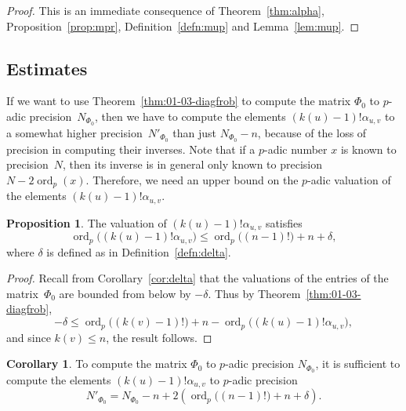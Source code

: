 \documentclass[a4paper,11pt]{article}
\numberwithin{equation}{section}
\DeclareMathOperator{\ord}{ord}          %
\theoremstyle{definition}
\newtheorem{prop}[thm]{Proposition}
\newtheorem{cor}[thm]{Corollary}
\begin{document}
\begin{proof}
This is an immediate consequence of Theorem~\ref{thm:alpha}, 
Proposition~\ref{prop:mpr}, Definition~\ref{defn:mup} and 
Lemma~\ref{lem:mup}.
\end{proof}

\subsection{Estimates}

If we want to use Theorem~\ref{thm:01-03-diagfrob} to compute the matrix 
$\Phi_0$ to $p$-adic precision~$N_{\Phi_0}$, then we have to compute the elements
$(k(u)-1)!\alpha_{u,v}$ to a somewhat higher precision~$N'_{\Phi_0}$ than just
$N_{\Phi_0}-n$, because of the loss of precision in computing their inverses. Note 
that if a $p$-adic number $x$ is known to precision~$N$, then its inverse 
is in general only known to precision $N-2\ord_p(x)$. Therefore, we need an 
upper bound on the $p$-adic valuation of the elements $(k(u)-1)!\alpha_{u,v}$.

\begin{prop}
The valuation of $(k(u)-1)! \alpha_{u,v}$ satisfies
\begin{equation*}
\ord_p\bigl((k(u)-1)! \alpha_{u,v}\bigr) 
    \leq \ord_p\bigl((n-1)!\bigr) + n + \delta,
\end{equation*}
where $\delta$ is defined as in Definition~\ref{defn:delta}. 
\end{prop}

\begin{proof}
Recall from Corollary~\ref{cor:delta} that the valuations 
of the entries of the matrix~$\Phi_0$ are bounded from below by $-\delta$. 
Thus by Theorem~\ref{thm:01-03-diagfrob}, 
\begin{equation*}
-\delta \leq \ord_p\bigl((k(v)-1)!\bigr) + n 
           - \ord_p\bigl((k(u)-1)! \alpha_{u,v}\bigr),
\end{equation*}
and since $k(v) \leq n$, the result follows.
\end{proof}

\begin{cor} \label{cor:Ntilde}
To compute the matrix $\Phi_0$ to $p$-adic precision $N_{\Phi_0}$, it is sufficient 
to compute the elements $(k(u)-1)!\alpha_{u,v}$ to $p$-adic precision
\begin{equation*}
N'_{\Phi_0}=N_{\Phi_0}-n+2(\ord_p\bigl((n-1)!\bigr)+n+\delta).
\end{equation*}
\end{cor}
\end{document}
